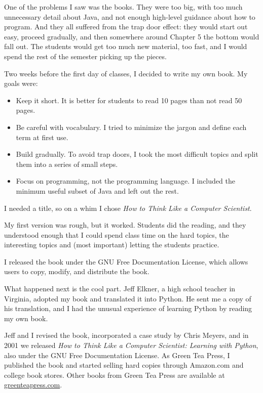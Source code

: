 \documentclass[10pt]{book}
\begin{document}
One of the problems I saw was the books.  
They were too big, with too much unnecessary detail about Java, and
not enough high-level guidance about how to program.  And they all
suffered from the trap door effect: they would start out easy,
proceed gradually, and then somewhere around Chapter 5 the bottom would
fall out.  The students would get too much new material, too fast,
and I would spend the rest of the semester picking up the pieces.

Two weeks before the first day of classes, I decided to write my
own book.  
My goals were:

\begin{itemize}

\item Keep it short.  It is better for students to read 10 pages
than not read 50 pages.

\item Be careful with vocabulary.  I tried to minimize the jargon
and define each term at first use.

\item Build gradually. To avoid trap doors, I took the most difficult
topics and split them into a series of small steps. 

\item Focus on programming, not the programming language.  I included
the minimum useful subset of Java and left out the rest.

\end{itemize}

I needed a title, so on a whim I chose {\em How to Think Like
a Computer Scientist}.

My first version was rough, but it worked.  Students did the reading,
and they understood enough that I could spend class time on the hard
topics, the interesting topics and (most important) letting the
students practice.

I released the book under the GNU Free Documentation License,
which allows users to copy, modify, and distribute the book.


What happened next is the cool part.  Jeff Elkner, a high school
teacher in Virginia, adopted my book and translated it into
Python.  He sent me a copy of his translation, and I had the
unusual experience of learning Python by reading my own book.

Jeff and I revised the book, incorporated a case study by
Chris Meyers, and in 2001 we released {\em How to Think Like
a Computer Scientist: Learning with Python}, also under
the GNU Free Documentation License.
As Green Tea Press, I published the book and started selling
hard copies through Amazon.com and college book stores.
Other books from Green Tea Press are available at
\url{greenteapress.com}.
\end{document}
